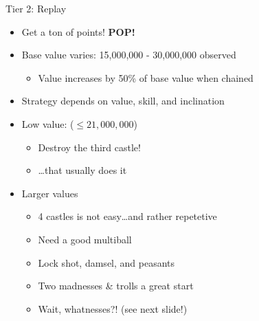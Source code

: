\documentclass{beamer}
\begin{document}
\begin{frame}{Tier 2: Replay}
\begin{itemize}
	\item Get a ton of points!  \textbf{POP!}
	\item Base value varies: 15,000,000 - 30,000,000 observed
	\begin{itemize}
		\item Value increases by 50\% of base value when chained
	\end{itemize}
	\item Strategy depends on value, skill, and inclination
	\item Low value: ($\leq 21,000,000$)
	\begin{itemize}
		\item Destroy the third castle!
		\item \ldots that usually does it
	\end{itemize}
	\item Larger values
	\begin{itemize}
		\item 4 castles is not easy\ldots and rather repetetive
		\item Need a good multiball
		\item Lock shot, damsel, and peasants
		\item Two madnesses \& trolls a great start
		\item Wait, whatnesses?!  (see next slide!)
	\end{itemize}
\end{itemize}
\end{frame}
\end{document}
